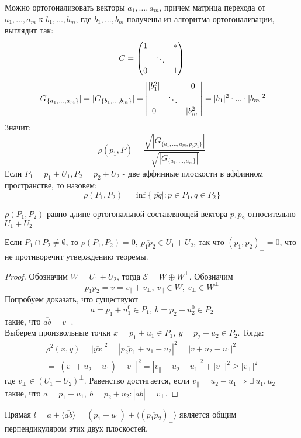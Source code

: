 Можно ортогонализовать векторы $a_1,\dots,a_m$, причем матрица перехода от $a_1,\dots,a_m$ к $b_1,\dots,b_m$, где $b_1,\dots,b_m$ получены из алгоритма ортогонализации, выглядит так:
\[C=\begin{pmatrix}
    1 & \null & *\\
    \null & \ddots & \null\\
    0 & \null & 1
\end{pmatrix}\]
\[|G_{\{a_1,\dots,a_m\}}| = |G_{\{b_1,\dots,b_m\}}| = \begin{vmatrix}
    |b_1^2| & \null & 0\\
    \null & \ddots & \null\\
    0 & \null & |b^2_m|
\end{vmatrix} = |b_1|^2 \cdot ... \cdot |b_m|^2\]
Значит:
\[\rho(p_1,P)=\frac{\sqrt{|G_{\{a_1,\dots,a_m,\overline{p_0p_1}\}}|}}{\sqrt{|G_{\{a_1,\dots,a_m\}}|}}\]
Если $P_1=p_1+U_1, P_2=p_2+U_2$ - две аффинные плоскости в аффинном пространстве, то назовем:
\[\rho(P_1,P_2)=\inf\{|\overline{pq}|: p\in P_1, q\in P_2\}\]
\begin{theorem}
    $\rho(P_1,P_2)$ равно длине ортогональной составляющей вектора $\overline{p_1p_2}$ относительно $U_1+U_2$
\end{theorem} 
\begin{remark}
    Если $P_1\cap P_2\ne \emptyset$, то $\rho(P_1,P_2)=0,\ \overline{p_1p_2} \in U_1+U_2$, так что $(p_1,p_2)_{\perp}=0$, что не противоречит утверждению теоремы.
\end{remark} 
\begin{proof}
    Обозначим $W=U_1+U_2$, тогда $\mathcal{E}=W\oplus W^{\perp}$. Обозначим 
    \[\overline{p_1p_2}=v=v_{\parallel}+v_{\perp},\ v_{\parallel}\in W,\ v_{\perp}\in W^{\perp}\] 
    Попробуем доказать, что существуют 
    \[a=p_1+u^0_1\in P_1,\ b=p_2+u^0_2\in P_2\] 
    такие, что $\overline{ab}=v_{\perp}$. \\
    Выберем произвольные точки $x=p_1+u_1\in P_1,\ y=p_2+u_2\in P_2$. Тогда:
    \begin{multline*}
        \rho^2(x,y)=|\overline{yx}|^2=|\overline{p_2p_1}+u_1-u_2|^2=|v+u_2-u_1|^2=\\
        =|(v_{\parallel}+u_2-u_1)+v_{\perp}|^2=|v_{\parallel}+u_2-u_1|^2+|v_{\perp}|^2\geq |v_{\perp}|^2
    \end{multline*}
    где $v_{\perp}\in (U_1+U_2)^{\perp}$. Равенство достигается, если $v_{\parallel}=u_2-u_1 \Rightarrow \exists\ u_1, u_2$ такие, что $a=p_1+u_1,\ b=p_2+u_2: |\overline{ab}|=v_{\perp}$.
\end{proof} 
\begin{consequense}
    Прямая $l=a+\langle \overline{ab} \rangle=(p_1+u_1)+\langle (\overline{p_1p_2})_{\perp} \rangle$ является общим перпендикуляром этих двух плоскостей.
\end{consequense} 
